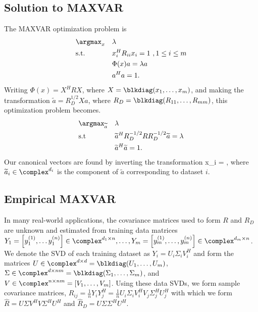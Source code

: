 \subsection{Solution to MAXVAR}
The MAXVAR optimization problem is
\begin{equation*}
\begin{aligned}
&\argmax_{x}&&\lambda\\
&\text{s.t.} &&x_i^HR_{ii}x_i  = 1\,\,,1\leq i\leq m\\
&&& \Phi(x) a = \lambda a\\
&&& a^Ha=1.\\
\end{aligned}
\end{equation*}
Writing $\Phi(x) = X^H R X$, where $X=\blkdiag(x_1,\dots,x_m)$, and making the
transformation $\widetilde{a}=R_D^{1/2}Xa$, where $R_D=\blkdiag(R_{11},\dots,R_{mm})$,
this optimization problem becomes.
\begin{equation*}
\begin{aligned}
&\argmax_{\widetilde{a}}&&\lambda\\
&\text{s.t}&& \widetilde{a}^HR_D^{-1/2}RR_D^{-1/2}\widetilde{a} = \lambda\\
&&& \widetilde{a}^H\widetilde{a}=1.\\
\end{aligned}
\end{equation*}
Our canonical vectors are found by inverting the transformation 
\be
x_i = ,
\ee
where $\widetilde{a}_i\in\complex^{d_i}$ is the component of $\widetilde{a}$ corresponding
to dataset $i$.

\subsection{Empirical MAXVAR}

In many real-world applications, the covariance matrices used to form $R$ and $R_D$ are
unknown and estimated from training data matrices $Y_1=\left[y_1^{(1)},\dots
  y_1^{(n)}\right]\in\complex^{d_1\times n},\dots, Y_m=\left[y_m^{(1)},\dots,
  y_m^{(n)}\right]\in\complex^{d_m\times n}$. We denote the SVD of each training dataset
as $Y_i=U_i\Sigma_iV_i^H$ and form the matrices $U\in\complex^{d\times
  d}=\blkdiag(U_1,\dots,U_m)$, $\Sigma\in\complex^{d\times
  nm}=\blkdiag(\Sigma_1,\dots,\Sigma_m)$, and $V\in\complex^{n\times nm}=[V_1,\dots,V_m]$.
Using these data SVDs, we form sample covariance matrices,
$\widehat{R}_{ij}=\frac{1}{n}Y_iY_j^H = \frac{1}{n}U_i\Sigma_iV_i^HV_j\Sigma_j^HU_j^H$
with which we form $\widehat{R}=U\Sigma V^HV\Sigma^HU^H$ and
$\widehat{R}_D=U\Sigma\Sigma^HU^H$.

